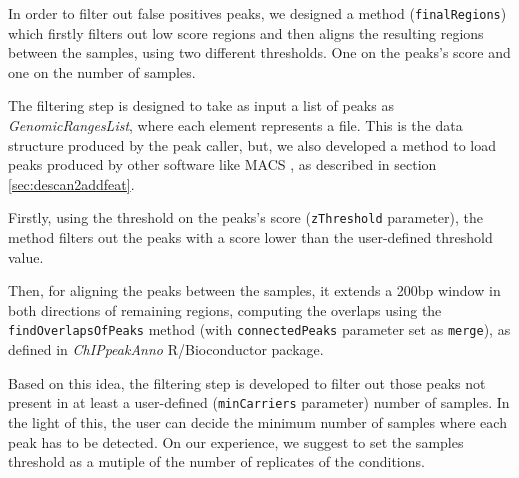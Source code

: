 
In order to filter out false positives peaks, we designed a method (\lstinline!finalRegions!) which firstly filters out low score regions and then aligns the resulting regions between the samples, using two different thresholds.
One on the peaks's score and one on the number of samples.

The filtering step is designed to take as input a list of peaks as \textit{GenomicRangesList}, where each element represents a file.
This is the data structure produced by the peak caller, but, we also developed a method to load peaks produced by other software like MACS \cite{Zhang2008}, as described in section \ref{sec:descan2addfeat}.

Firstly, using the threshold on the peaks's score (\lstinline!zThreshold! parameter), the method filters out the peaks with a score lower than the user-defined threshold value.

Then, for aligning the peaks between the samples, it extends a 200bp window in both directions of remaining regions, computing the overlaps using the \lstinline!findOverlapsOfPeaks! method (with \lstinline!connectedPeaks! parameter set as \lstinline!merge!), as defined in \textit{ChIPpeakAnno} \cite{Zhu2010} R/Bioconductor package.

Based on this idea, the filtering step is developed to filter out those peaks not present in at least a user-defined (\lstinline!minCarriers! parameter) number of samples. In the light of this, the user can decide the minimum number of samples where each peak has to be detected.
On our experience, we suggest to set the samples threshold as a mutiple of the number of replicates of the conditions.

